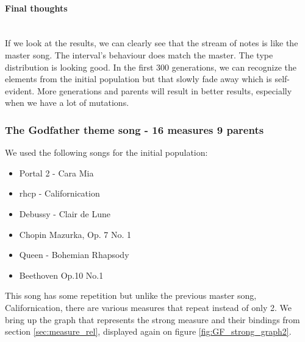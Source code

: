 \documentclass[a4paper]{article}
\begin{document}
\clearpage


\paragraph{Final thoughts}\mbox{}\\
If we look at the results, we can clearly see that the stream of notes is like the master song. The interval's behaviour does match the master. The type distribution is looking good. In the first 300 generations, we can recognize the elements from the initial population but that slowly fade away which is self-evident. More generations and parents will result in better results, especially when we have a lot of mutations.



\subsubsection{The Godfather theme song - 16 measures 9 parents}

We used the following songs for the initial population:
\begin{itemize}
	\item Portal 2 - Cara Mia
	\item rhcp - Californication 
	\item Debussy - Clair de Lune
	\item Chopin Mazurka, Op. 7 No. 1
	\item Queen - Bohemian Rhapsody 
	\item Beethoven Op.10 No.1 
\end{itemize}

This song has some repetition but unlike the previous master song, Californication, there are various measures that repeat instead of only 2. We bring up the graph that represents the strong measure and their bindings from section \ref{sec:measure_rel}, displayed again on figure \ref{fig:GF_strong_graph2}.
\end{document}
